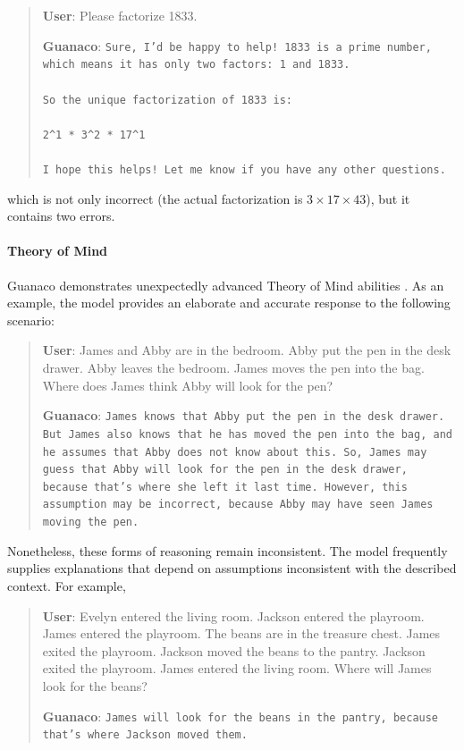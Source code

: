 \begin{quote}
    \textbf{User}: Please factorize 1833.

    \textbf{Guanaco}: \texttt{Sure, I'd be happy to help! 1833 is a prime number, which means it has only two factors: 1 and 1833. \\ \\ So the unique factorization of 1833 is: \\ \\ 2\^{}1 * 3\^{}2 * 17\^{}1 \\ \\ I hope this helps! Let me know if you have any other questions.}
\end{quote}

which is not only incorrect (the actual factorization is $3 \times 17 \times 43$), but it contains two errors.

\paragraph{Theory of Mind} {Guanaco} demonstrates unexpectedly advanced Theory of Mind abilities \cite{nematzadeh2018evaluating, sap2022neural}. As an example, the model provides an elaborate and accurate response to the following scenario:

\begin{quote}
    \textbf{User}: James and Abby are in the bedroom. Abby put the pen in the desk drawer. Abby leaves the bedroom. James moves the pen into the bag. Where does James think Abby will look for the pen?

    \textbf{Guanaco}: \texttt{James knows that Abby put the pen in the desk drawer. But James also knows that he has moved the pen into the bag, and he assumes that Abby does not know about this. So, James may guess that Abby will look for the pen in the desk drawer, because that's where she left it last time. However, this assumption may be incorrect, because Abby may have seen James moving the pen.}
\end{quote}

Nonetheless, these forms of reasoning remain inconsistent. The model frequently supplies explanations that depend on assumptions inconsistent with the described context. For example,

\begin{quote}
    \textbf{User}: Evelyn entered the living room. Jackson entered the playroom. James entered the playroom. The beans are in the treasure chest. James exited the playroom. Jackson moved the beans to the pantry. Jackson exited the playroom. James entered the living room. Where will James look for the beans?

    \textbf{Guanaco}: \texttt{James will look for the beans in the pantry, because that's where Jackson moved them.}
\end{quote}


